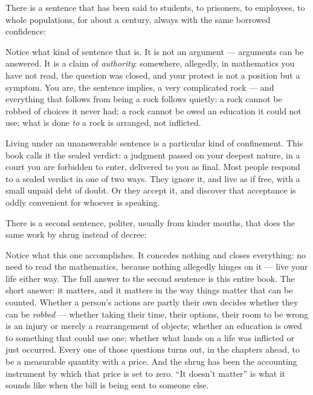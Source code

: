
There is a sentence that has been said to students, to prisoners, to
employees, to whole populations, for about a century, always with the
same borrowed confidence:


Notice what kind of sentence that is. It is not an argument --- arguments
can be answered. It is a claim of \emph{authority}: somewhere, allegedly, in
mathematics you have not read, the question was closed, and your
protest is not a position but a symptom. You are, the sentence implies,
a very complicated rock --- and everything that follows from being a rock
follows quietly: a rock cannot be robbed of choices it never had; a rock
cannot be owed an education it could not use; what is done \emph{to} a rock
is arranged, not inflicted.

Living under an unanswerable sentence is a particular kind of
confinement. This book calls it the sealed verdict: a judgment passed
on your deepest nature, in a court you are forbidden to enter,
delivered to you as final. Most people respond to a sealed verdict in
one of two ways. They ignore it, and live as if free, with a small
unpaid debt of doubt. Or they accept it, and discover
that acceptance is oddly convenient for whoever is speaking.

There is a second sentence, politer, usually from kinder mouths, that
does the same work by shrug instead of decree:


Notice what this one accomplishes. It concedes nothing and closes
everything: no need to read the mathematics, because nothing allegedly
hinges on it --- live your life either way. The full answer to the
second sentence is this entire book. The short answer: it matters, and
it matters in the way things matter that can be counted. Whether a person's actions are partly
their own decides whether they can be \emph{robbed} --- whether taking their
time, their options, their room to be wrong is an injury or merely a
rearrangement of objects; whether an education is owed to something
that could use one; whether what lands on a life was inflicted or just
occurred. Every one of those questions turns out, in the chapters
ahead, to be a measurable quantity with a price. And the shrug has
been the accounting instrument by which that price is set to zero.
``It doesn't matter'' is what it sounds like when the bill is being
sent to someone else.

